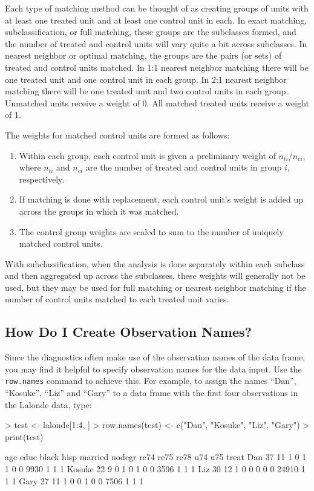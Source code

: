 \documentclass[oneside,letterpaper,titlepage]{article}
\begin{document}
Each type of matching method can be thought of as creating groups of
units with at least one treated unit and at least one control unit in
each.  In exact matching, subclassification, or full matching, these
groups are the subclasses formed, and the number of treated and
control units will vary quite a bit across subclasses.  In nearest
neighbor or optimal matching, the groups are the pairs (or sets) of
treated and control units matched.  In 1:1 nearest neighbor matching
there will be one treated unit and one control unit in each group.  In
2:1 nearest neighbor matching there will be one treated unit and two
control units in each group.  Unmatched units receive a weight of 0.
All matched treated units receive a weight of 1.

The weights for matched control units are formed as follows:
\begin{enumerate}
\item Within each group, each control unit is given a preliminary
  weight of $n_{ti}/n_{ci}$, where $n_{ti}$ and $n_{ci}$ are the
  number of treated and control units in group $i$, respectively.
\item If matching is done with replacement, each control unit's weight
  is added up across the groups in which it was matched.
\item The control group weights are scaled to sum to the number of
  uniquely matched control units.
\end{enumerate}

With subclassification, when the analysis is done separately within
each subclass and then aggregated up across the subclasses, these
weights will generally not be used, but they may be used for full
matching or nearest neighbor matching if the number of control units
matched to each treated unit varies.

\subsection{How Do I Create Observation Names?}
\label{rnames}

Since the diagnostics often make use of the observation names of the
data frame, you may find it helpful to specify observation names for
the data input.  Use the \texttt{row.names} command to achieve this.
For example, to assign the names ``Dan'', ``Kosuke'', ``Liz'' and
``Gary'' to a data frame with the first four observations in the
Lalonde data, type:

\begin{Schunk}
\begin{Sinput}
> test <- lalonde[1:4, ]
> row.names(test) <- c("Dan", "Kosuke", "Liz", "Gary")
> print(test)
\end{Sinput}
\begin{Soutput}
       age educ black hisp married nodegr re74 re75  re78 u74 u75 treat
Dan     37   11     1    0       1      1    0    0  9930   1   1     1
Kosuke  22    9     0    1       0      1    0    0  3596   1   1     1
Liz     30   12     1    0       0      0    0    0 24910   1   1     1
Gary    27   11     1    0       0      1    0    0  7506   1   1     1
\end{Soutput}
\end{Schunk}
\end{document}
